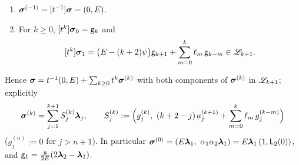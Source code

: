 \begin{prop}
\label{prop:lea-sigma}
\begin{enumerate}
\item $\boldsymbol{\sigma}^{(-1)} = [t^{-1}]\boldsymbol{\sigma} = (0,E)$.
\item For $k\geq 0$, $[t^k]\boldsymbol{\sigma}_0 = \mathsf{g}_k$ and
\begin{equation}
\label{eq:lea-sigk}
[t^k]\boldsymbol{\sigma}_1 = \bigl(E - (k+2)\psi\bigr)\mathsf{g}_{k+1} + \sum_{m=0}^{k}\ell_m\,\mathsf{g}_{k-m}\in\mathscr{L}_{k+1}.
\end{equation}
\end{enumerate}
Hence $\boldsymbol{\sigma} = t^{-1}(0,E) + \sum_{k\geq 0}t^k\boldsymbol{\sigma}^{(k)}$ with both components of $\boldsymbol{\sigma}^{(k)}$ in $\mathscr{L}_{k+1}$; explicitly
\begin{equation}
\label{eq:lea-Sj}
\boldsymbol{\sigma}^{(k)} = \sum_{j=1}^{k+1}S_j^{(k)}\boldsymbol{\lambda}_j,\qquad S_j^{(k)} := \Bigl(g_j^{(k)},\ (k+2-j)\,a_j^{(k+1)} + \sum_{m=0}^{k}\ell_m\,g_j^{(k-m)}\Bigr)
\end{equation}
($g_j^{(n)} := 0$ for $j > n+1$). In particular $\brow^{(0)} = (E\lf_1,\ \alpha_1\alpha_2\lf_1) = E\lf_1\,(1,\Lv_2(0))$, and $\mathsf{g}_1 = \frac{\mathsf{u}}{2E}(2\boldsymbol{\lambda}_2 - \boldsymbol{\lambda}_1)$.
\end{prop}

